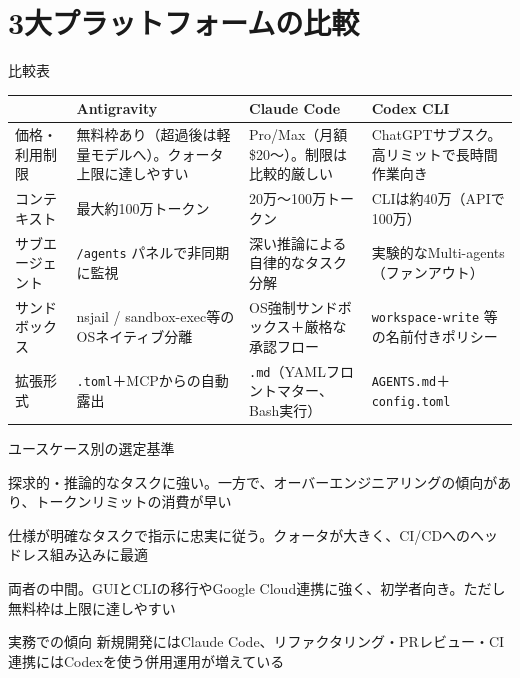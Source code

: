 \documentclass[aspectratio=169,11pt]{beamer}
\newcommand{\cmd}[1]{\texttt{#1}}
\begin{document}
\section{3大プラットフォームの比較}

\begin{frame}{比較表}
  \scriptsize
  \begin{tabularx}{\textwidth}{P{22mm}LLL}
    \toprule
    & Antigravity & Claude Code & Codex CLI \\
    \midrule
    価格・利用制限 & 無料枠あり（超過後は軽量モデルへ）。クォータ上限に達しやすい & Pro/Max（月額\$20〜）。制限は比較的厳しい & ChatGPTサブスク。高リミットで長時間作業向き \\
    コンテキスト & 最大約100万トークン & 20万〜100万トークン & CLIは約40万（APIで100万） \\
    サブエージェント & \cmd{/agents} パネルで非同期に監視 & 深い推論による自律的なタスク分解 & 実験的なMulti-agents（ファンアウト） \\
    サンドボックス & nsjail / sandbox-exec等のOSネイティブ分離 & OS強制サンドボックス＋厳格な承認フロー & \cmd{workspace-write} 等の名前付きポリシー \\
    拡張形式 & \cmd{.toml}＋MCPからの自動露出 & \cmd{.md}（YAMLフロントマター、Bash実行） & \cmd{AGENTS.md}＋\cmd{config.toml} \\
    \bottomrule
  \end{tabularx}
  \par\hfill{\scriptsize\cite{r18,r19,r28,r51}}
\end{frame}

\begin{frame}{ユースケース別の選定基準}
  \begin{description}[Antigravity]
    \item[Claude Code] 探求的・推論的なタスクに強い。一方で、オーバーエンジニアリングの傾向があり、トークンリミットの消費が早い\cite{r19}
    \item[Codex CLI] 仕様が明確なタスクで指示に忠実に従う。クォータが大きく、CI/CDへのヘッドレス組み込みに最適\cite{r19}
    \item[Antigravity] 両者の中間。GUIとCLIの移行やGoogle Cloud連携に強く、初学者向き。ただし無料枠は上限に達しやすい\cite{r18,r23}
  \end{description}
  \vspace{0.5em}
  \begin{exampleblock}{実務での傾向}
    新規開発にはClaude Code、リファクタリング・PRレビュー・CI連携にはCodexを使う\alert{併用運用}が増えている\cite{r50}
  \end{exampleblock}
\end{frame}
\end{document}
